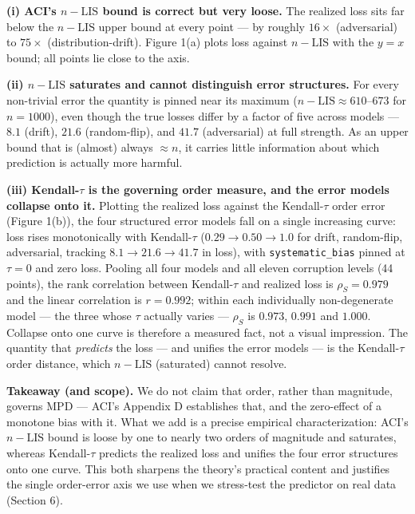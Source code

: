 \textbf{(i) ACI's \(n-\mathrm{LIS}\) bound is correct but very loose.}
The realized loss sits far below the \(n-\mathrm{LIS}\) upper bound at
every point --- by roughly \(16\times\) (adversarial) to \(75\times\)
(distribution-drift). Figure 1(a) plots loss against \(n-\mathrm{LIS}\)
with the \(y=x\) bound; all points lie close to the axis.

\textbf{(ii) \(n-\mathrm{LIS}\) saturates and cannot distinguish error
structures.} For every non-trivial error the quantity is pinned near its
maximum (\(n-\mathrm{LIS}\approx 610\)--\(673\) for \(n=1000\)), even
though the true losses differ by a factor of five across models ---
\(8.1\) (drift), \(21.6\) (random-flip), and \(41.7\) (adversarial) at
full strength. As an upper bound that is (almost) always \(\approx n\),
it carries little information about which prediction is actually more
harmful.

\textbf{(iii) Kendall-\(\tau\) is the governing order measure, and the
error models collapse onto it.} Plotting the realized loss against the
Kendall-\(\tau\) order error (Figure 1(b)), the four structured error
models fall on a single increasing curve: loss rises monotonically with
Kendall-\(\tau\) (\(0.29\to0.50\to1.0\) for drift, random-flip,
adversarial, tracking \(8.1\to21.6\to41.7\) in loss), with
\texttt{systematic\_bias} pinned at \(\tau=0\) and zero loss. Pooling
all four models and all eleven corruption levels (44 points), the rank
correlation between Kendall-\(\tau\) and realized loss is
\(\rho_S = 0.979\) and the linear correlation is \(r = 0.992\); within
each individually non-degenerate model --- the three whose \(\tau\)
actually varies --- \(\rho_S\) is \(0.973\), \(0.991\) and \(1.000\).
Collapse onto one curve is therefore a measured fact, not a visual
impression. The quantity that \emph{predicts} the loss --- and unifies
the error models --- is the Kendall-\(\tau\) order distance, which
\(n-\mathrm{LIS}\) (saturated) cannot resolve.

\textbf{Takeaway (and scope).} We do not claim that order, rather than
magnitude, governs MPD --- ACI's Appendix D establishes that, and the
zero-effect of a monotone bias with it. What we add is a precise
empirical characterization: ACI's \(n-\mathrm{LIS}\) bound is loose by
one to nearly two orders of magnitude and saturates, whereas
Kendall-\(\tau\) predicts the realized loss and unifies the four error
structures onto one curve. This both sharpens the theory's practical
content and justifies the single order-error axis we use when we
stress-test the predictor on real data (Section 6).
